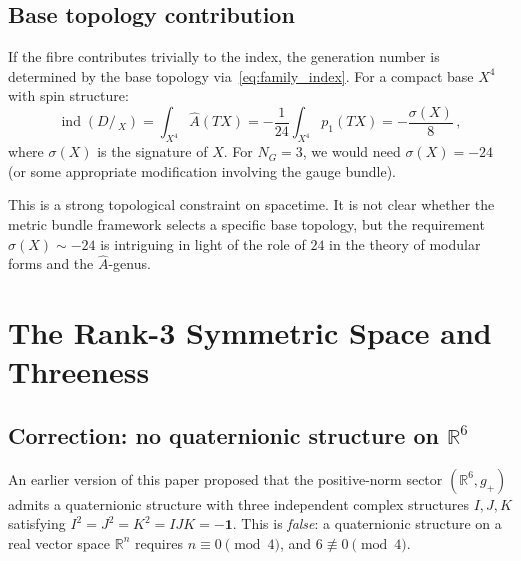 \documentclass[12pt,a4paper]{article}
\theoremstyle{definition}
\newcommand{\ind}{\operatorname{ind}}
\newcommand{\R}{\mathbb{R}}
\newcommand{\Ahat}{\hat{A}}
\begin{document}
\subsection{Base topology contribution}

If the fibre contributes trivially to the index, the generation number is determined by the base topology via~\eqref{eq:family_index}.
For a compact base $X^4$ with spin structure:
\begin{equation}
\ind(D\!\!\!\!/\,_X) = \int_{X^4} \Ahat(TX) = -\frac{1}{24} \int_{X^4} p_1(TX) = -\frac{\sigma(X)}{8}\,,
\end{equation}
where $\sigma(X)$ is the signature of $X$.
For $N_G = 3$, we would need $\sigma(X) = -24$ (or some appropriate modification involving the gauge bundle).

This is a strong topological constraint on spacetime.
It is not clear whether the metric bundle framework selects a specific base topology, but the requirement $\sigma(X) \sim -24$ is intriguing in light of the role of $24$ in the theory of modular forms and the $\hat{A}$-genus.


\section{The Rank-3 Symmetric Space and Threeness}
\label{sec:rank3}

\subsection{Correction: no quaternionic structure on \texorpdfstring{$\R^6$}{R6}}

An earlier version of this paper proposed that the positive-norm sector $(\R^6, g_+)$ admits a quaternionic structure with three independent complex structures $I, J, K$ satisfying $I^2 = J^2 = K^2 = IJK = -\mathbf{1}$.
This is \emph{false}: a quaternionic structure on a real vector space $\R^n$ requires $n \equiv 0 \pmod{4}$, and $6 \not\equiv 0 \pmod{4}$.
\end{document}
